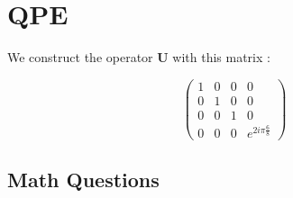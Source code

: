 \documentclass{article}
\theoremstyle{plain}
\begin{document}
  \newpage
  \section{QPE}

    We construct the operator $\mathbf{U}$ with this matrix :

    \[
      \begin{pmatrix}
        1 & 0 & 0 & 0 \\
        0 & 1 & 0 & 0 \\
        0 & 0 & 1 & 0 \\
        0 & 0 & 0 & e^{2i \pi \frac 6 8}
      \end{pmatrix}
    \]

    \subsection{Math Questions}
\end{document}
